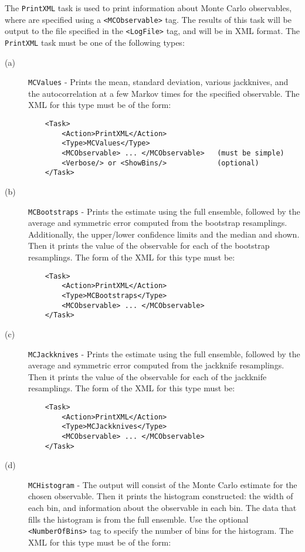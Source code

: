 \documentclass[12pt]{article}
\newcommand{\vb}{\texttt}
\begin{document}
The \vb{PrintXML} task is used to print information about Monte Carlo observables,
where are specified using a \vb{<MCObservable>} tag.
The results of this task will be output to the file specified in the
\vb{<LogFile>} tag, and will be in XML format.
The \vb{PrintXML} task must be one of the following types:
\begin{description}
\item[(a)] \vb{MCValues} - Prints the mean, standard deviation, various jackknives, and
  the autocorrelation at a few Markov times for the specified observable.
  The XML for this type must be of the form:
\begin{verbatim}
    <Task>
        <Action>PrintXML</Action>
        <Type>MCValues</Type>
        <MCObservable> ... </MCObservable>   (must be simple)
        <Verbose/> or <ShowBins/>            (optional)
    </Task>
\end{verbatim}
\item[(b)] \vb{MCBootstraps} - Prints the estimate using the full ensemble, followed by
the average and symmetric error computed from the bootstrap resamplings. Additionally,
the upper/lower confidence limits and the median and shown.
Then it prints the value of the observable for each of the bootstrap resamplings.
The form of the XML for this type must be:
\begin{verbatim}
    <Task>
        <Action>PrintXML</Action>
        <Type>MCBootstraps</Type>
        <MCObservable> ... </MCObservable>
    </Task>
\end{verbatim}
\item[(c)] \vb{MCJackknives} - Prints the estimate using the full ensemble, followed by
the average and symmetric error computed from the jackknife resamplings.
Then it prints the value of the observable for each of the jackknife resamplings.
The form of the XML for this type must be:
\begin{verbatim}
    <Task>
        <Action>PrintXML</Action>
        <Type>MCJackknives</Type>
        <MCObservable> ... </MCObservable>
    </Task>
\end{verbatim}
\item[(d)] \vb{MCHistogram} - The output will consist of the Monte Carlo estimate for the chosen
  observable. Then it prints the histogram constructed: the width of each bin, and information
  about the observable in each bin.
  The data that fills the histogram is from the full ensemble.
  Use the optional \vb{<NumberOfBins>} tag to specify the number of
  bins for the histogram. The XML for this type must be of the form:

\end{description}
\end{document}

